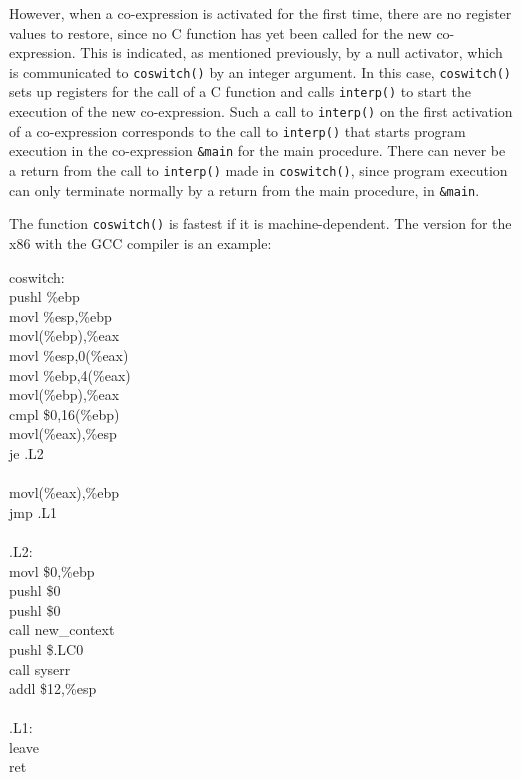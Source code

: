 However, when a co-expression is activated for the first time, there
are no register values to restore, since no C function has yet been
called for the new co-expression. This is indicated, as mentioned
previously, by a null activator, which is communicated to
\texttt{coswitch()} by an integer argument. In this case,
\texttt{coswitch()} sets up registers for the call of a C function and
calls \texttt{interp()} to start the execution of the new
co-expression.  Such a call to \texttt{interp()} on the first
activation of a co-expression corresponds to the call to
\texttt{interp()} that starts program execution in the co-expression
\texttt{\&main} for the main procedure. There can never be a return
from the call to \texttt{interp()} made in \texttt{coswitch()}, since
program execution can only terminate normally by a return from the
main procedure, in \texttt{\&main}.

The function \texttt{coswitch()} is fastest if it is
machine-dependent. The version for the x86 with the GCC compiler is an
example:

\begin{iconcode}
coswitch:\\
\>pushl\>\> \%ebp\\
\>movl\>\> \%esp,\%ebp\\
\>movl\>(\%ebp),\%eax\\
\>movl\>\> \%esp,0(\%eax)\\
\>movl\>\> \%ebp,4(\%eax)\\
\>movl\>(\%ebp),\%eax\\
\>cmpl\>\> \$0,16(\%ebp)\\
\>movl\>(\%eax),\%esp\\
\>je\>\> .L2\\
\\
\>movl\>(\%eax),\%ebp\\
\>jmp\>\> .L1\\
\\
.L2:\\
\>movl\>\> \$0,\%ebp\\
\>pushl\>\> \$0\\
\>pushl\>\> \$0\\
\>call\>\> new\_context\\
\>pushl\>\> \$.LC0\\
\>call\>\> syserr\\
\>addl\>\> \$12,\%esp\\
\\
.L1:\\
\>leave\\
\>ret
\end{iconcode}

